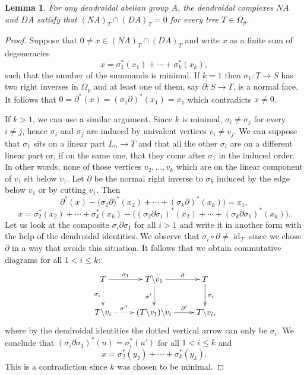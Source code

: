 \documentclass[a4paper]{amsart}
\theoremstyle{plain}
\newtheorem{lem}[thm]{Lemma}
\theoremstyle{definition}
\theoremstyle{remark}
\DeclareMathOperator{\id}{id}
\newcommand{\rpd}{\Omega_p}
\newcommand{\To}{\longrightarrow}
\numberwithin{equation}{section}
\numberwithin{figure}{section}
\begin{document}
\begin{lem}\label{direct sum 1}
    For any dendroidal abelian group $A$, the dendroidal complexes $NA$ and $DA$ satisfy that $(NA)_T\cap (DA)_T={0}$ for every tree $T\in\rpd$.
\end{lem}
\begin{proof}
    Suppose that $0\neq x\in (NA)_T\cap(DA)_T$ and write $x$ as a finite sum of degeneracies
    \[
        x=\sigma_1^*(x_1)+\cdots+\sigma_k^*(x_k),
    \]
    such that the number of the summands is minimal. If $k=1$ then $\sigma_1\colon T\To S$ has two right inverses in $\rpd$ and at
    least one of them, say $\partial\colon S\To T$, is a normal face. It follows that $0=\partial^*(x)=(\sigma_1\partial)^*(x_1)=x_1$
    which contradicts $x\neq 0$.

    If $k>1$, we can use a similar argument.  Since $k$ is minimal, $\sigma_i\neq \sigma_j$ for every $i\ne j$, hence $\sigma_i$ and $\sigma_j$ are induced by univalent vertices
    $v_i\neq v_j$. We can suppose that $\sigma_1$ sits on a linear part $L_n\To T$ and that all the other $\sigma_i$ are on a different linear part or, if on the same one, that they come after $\sigma_1$ in the induced order. In other words, none of those vertices $v_2,\ldots,v_k$ which are on the linear component of $v_1$ sit below $v_1$. Let $\partial$ be the normal right inverse to $\sigma_k$ induced by the edge below $v_1$ or by cutting $v_1$. Then
    \[
        \partial^*(x)-\big(\sigma_2\partial)^*(x_2)+\cdots+(\sigma_{k}\partial)^*(x_{k})\big)=x_1,
    \]
    \[
        x=\sigma^*_2(x_2)+\cdots+\sigma^*_{k}(x_{k})-\big((\sigma_2\partial\sigma_1)^*(x_2)+\cdots+(\sigma_{k}
        \partial\sigma_1)^*(x_{k})\big).
    \]
    Let us look at the composite $\sigma_i\partial\sigma_1$ for all $i>1$ and write it in another form with the help of the dendroidal identities. We observe that $\sigma_i\circ\partial\ne \id_T$ since we chose $\partial$ in a way that avoids this situation.
    It follows that we obtain commutative diagrams for all $1<i\le k$:
    \[
        \xymatrix{T\ar[r]^-{\sigma_1}\ar@{.>}[d]_-{\sigma_i}& T\backslash v_1\ar[r]^-\partial\ar[d]_{\sigma'} &T\ar[d]^{\sigma_i}\\
        T\backslash v_i\ar@{.>}[r]^-{\sigma''} &(T\backslash v_1)\backslash v_i \ar[r]^-{\partial'} &T\backslash v_i{\rlap ,}}
    \]
    where by the dendroidal identities the dotted vertical arrow can only be $\sigma_i$. We conclude that $(\sigma_i\partial\sigma_1)^*(u)=\sigma_i^*(u')$
    for all $1<i\le k$ and
    \[
        x=\sigma_2^*(y_2)+\cdots+\sigma_{k}^*(y_{k}).
    \]
    This is a contradiction since $k$ was chosen to be minimal.
\end{proof}
\end{document}
